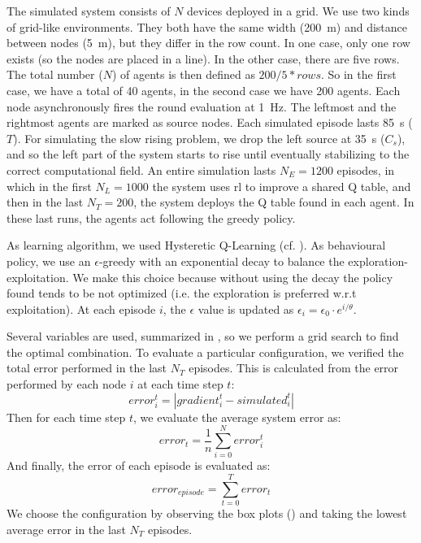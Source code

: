 The simulated system consists of $N$ devices deployed in a grid. 
%
We use two kinds of grid-like environments. 
%
They both have the same width (\SI{200}{\metre}) and distance between nodes (\SI{5}{\metre}), but they differ in the row count. 
%
In one case, only one row exists (so the nodes are placed in a line). 
%
In the other case, there are five rows. 
%
The total number ($N$) of agents is then defined as $ 200 / 5 * rows $. 
%
So in the first case, we have a total of 40 agents, in the second case we have 200 agents. 
%
Each node asynchronously fires the round evaluation at \SI{1}{\hertz}.
%
The leftmost and the rightmost agents are marked as source nodes. 
%
Each simulated episode lasts \SI{85}{\second} ($T$).
%
For simulating the slow rising problem, we drop the left source at \SI{35}{\second} ($C_s$), and so the left part of the system starts to rise until eventually stabilizing to the correct computational field.
%
An entire simulation lasts $N_E = 1200$ episodes, in which in the first $N_L = 1000$ the system uses \ac{rl} to improve a shared Q table, and then in the last $N_T = 200$, the system deploys the Q table found in each agent. 
%
In these last runs, the agents act following the greedy policy.

As learning algorithm, we used Hysteretic Q-Learning (cf. ). %
%
As behavioural policy, we use an $\epsilon$-greedy with an exponential decay to balance the exploration-exploitation.
%
We make this choice because without using the decay the policy found tends to be not optimized (i.e. the exploration is preferred w.r.t exploitation).
%
At each episode $i$, the $\epsilon$ value is updated as $\epsilon_i = \epsilon_0 \cdot e^{{i} / \theta}$.

Several variables are used, summarized in , so we perform a grid search to find the optimal combination.
%
To evaluate a particular configuration, we verified the total error performed in the last $N_T$ episodes.
%
This is calculated from the error performed by each node $i$ at each time step $t$:
\begin{equation}
error_i^{t} = |gradient_i^{t} - simulated_i^t|
\end{equation}
Then for each time step $t$, we evaluate the average system error as:
\begin{equation}
error_{t} = \frac{1}{n}\sum_{i = 0}^N error_i^t
\end{equation}
And finally, the error of each episode is evaluated as:
\begin{equation}
error_{episode} = \sum_{t = 0}^T error_{t}
\end{equation}
We choose the configuration by observing the box plots () and taking the lowest average error in the last $N_T$ episodes.

